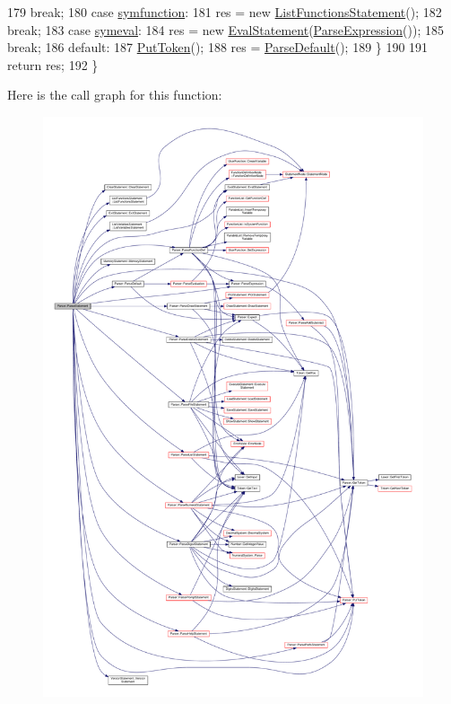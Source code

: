 \begin{DoxyCode}
179         \textcolor{keywordflow}{break};
180     \textcolor{keywordflow}{case} \hyperlink{lex_8h_a7feef761cd73fac6e25b8bb80d2c4e54ac0ac9c237f5df41937de351d33daeef4}{symfunction}:
181         res = \textcolor{keyword}{new} \hyperlink{classListFunctionsStatement}{ListFunctionsStatement}();
182         \textcolor{keywordflow}{break};
183     \textcolor{keywordflow}{case} \hyperlink{lex_8h_a7feef761cd73fac6e25b8bb80d2c4e54a57c965a74493e9751bca9cc3735b0365}{symeval}:
184         res = \textcolor{keyword}{new} \hyperlink{classEvalStatement}{EvalStatement}(\hyperlink{classParser_ae46b0a87abe76f40ae117c5bdcb2f29d}{ParseExpression}());
185         \textcolor{keywordflow}{break};
186     \textcolor{keywordflow}{default}:
187         \hyperlink{classParser_adb5c3a188b36f7ecb198ae30f06338b3}{PutToken}();
188         res = \hyperlink{classParser_aca8329fb5ee4812398144fd1d647fe39}{ParseDefault}();
189     \}
190 
191     \textcolor{keywordflow}{return} res;
192 \}
\end{DoxyCode}


Here is the call graph for this function\+:
\nopagebreak
\begin{figure}[H]
\begin{center}
\leavevmode
\includegraphics[width=350pt]{d0/d40/classParser_a370277018ad3e0e157a8ff5849892f7d_cgraph}
\end{center}
\end{figure}




